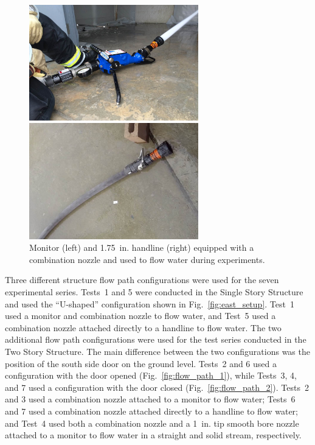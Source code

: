 \documentclass[12pt,oneside]{book}
\begin{document}
\begin{figure}[!ht]
	\minipage{3in}
	\begin{center}
		\includegraphics[width=2.9in]{../Figures/Pictures/monitor}
	\end{center} 
	\endminipage \hfill
	\minipage{3in}
	\begin{center}
		\includegraphics[width=2.9in]{../Figures/Pictures/handline}
	\end{center}
	\endminipage \hfill
	\caption[Monitor and handline equipped with a combination nozzle.]{Monitor (left) and 1.75~in. handline (right) equipped with a combination nozzle and used to flow water during experiments.}
	\label{fig:monitor+handline}
\end{figure}

Three different structure flow path configurations were used for the seven experimental series. Tests~1 and 5 were conducted in the Single Story Structure and used the ``U-shaped'' configuration shown in Fig.~\ref{fig:east_setup}. Test~1 used a monitor and combination nozzle to flow water, and Test~5 used a combination nozzle attached directly to a handline to flow water. The two additional flow path configurations were used for the test series conducted in the Two Story Structure. The main difference between the two configurations was the position of the south side door on the ground level. Tests~2 and 6 used a configuration with the door opened (Fig.~\ref{fig:flow_path_1}), while Tests~3, 4, and 7 used a configuration with the door closed (Fig.~\ref{fig:flow_path_2}). Tests~2 and 3 used a combination nozzle attached to a monitor to flow water; Tests~6 and 7 used a combination nozzle attached directly to a handline to flow water; and Test~4 used both a combination nozzle and a 1~in. tip smooth bore nozzle attached to a monitor to flow water in a straight and solid stream, respectively. 
\end{document}
